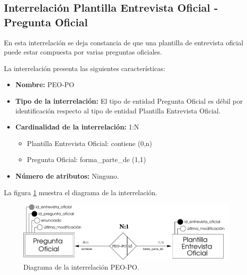 \subsection{Interrelación Plantilla Entrevista Oficial - Pregunta Oficial}

   \begin{description}
      \item[Definición] En esta interrelación se deja constancia de que una
      plantilla de entrevista oficial puede estar compuesta por varias preguntas
      oficiales.

      \item[Características] La interrelación presenta las siguientes
                             características:

         \begin{itemize}
            \item \textbf{Nombre:} PEO-PO
            \item \textbf{Tipo de la interrelación:} El tipo de entidad Pregunta
                  Oficial es débil por identificación respecto al tipo de
                  entidad Plantilla Entrevista Oficial.
            \item \textbf{Cardinalidad de la interrelación:} 1:N
                  \begin{itemize}
                     \item Plantilla Entrevista Oficial: contiene (0,n)
                     \item Pregunta Oficial: forma\_parte\_de (1,1)
                  \end{itemize}
            \item \textbf{Número de atributos:} Ninguno.
         \end{itemize}

      \item[Diagrama] La figura \ref{diagramaPEO-PO} muestra el diagrama de la
                      interrelación.

      \item \begin{figure}[!ht]
            \begin{center}
            \includegraphics[]{07.Modelo_Entidad-Interrelacion/7.3.Analisis_Interrelaciones/diagramas/PEO-PO.pdf}
            \caption{Diagrama de la interrelación PEO-PO.}
            \label{diagramaPEO-PO}
            \end{center}
         \end{figure}


\end{description}
